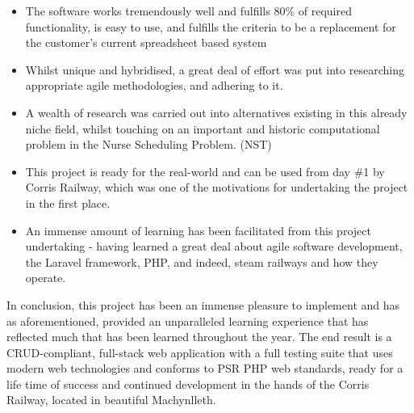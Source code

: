 \begin{itemize}
    \item The software works tremendously well and fulfills 80\% of required functionality, is easy to use, and fulfills the criteria to be a replacement for the customer's current spreadsheet based system
    \item Whilst unique and hybridised, a great deal of effort was put into researching appropriate agile methodologies, and adhering to it.
    \item A wealth of research was carried out into alternatives existing in this already niche field, whilst touching on an important and historic computational problem in the Nurse Scheduling Problem. (NST)
    \item This project is ready for the real-world and can be used from day \#1 by Corris Railway, which was one of the motivations for undertaking the project in the first place.
    \item An immense amount of learning has been facilitated from this project undertaking - having learned a great deal about agile software development, the Laravel framework, PHP, and indeed, steam railways and how they operate.
\end{itemize}

In conclusion, this project has been an immense pleasure to implement and has as aforementioned, provided an unparalleled learning experience that has reflected much that has been learned throughout the year. The end result is a CRUD-compliant, full-stack web application with a full testing suite that uses modern web technologies and conforms to PSR PHP web standards, ready for a life time of success and continued development in the hands of the Corris Railway, located in beautiful Machynlleth.